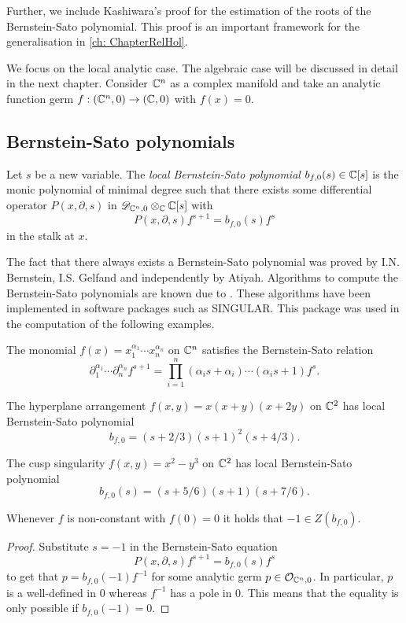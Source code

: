 Further, we include Kashiwara's proof for the estimation of the roots of the Bernstein-Sato polynomial.
This proof is an important framework for the generalisation in \cref{ch: ChapterRelHol}.

We focus on the local analytic case.
The algebraic case will be discussed in detail in the next chapter.
Consider $\mathbb{C}^n$ as a complex manifold and take an analytic function germ $f:(\mathbb{C}^n,0)\to (\mathbb{C},0)$ with  $f(x) = 0$.
\subsection{Bernstein-Sato polynomials}\label{sec: bspoly}
\begin{definition}
  Let $s$ be a new variable.
  The {\it local Bernstein-Sato polynomial} $b_{f,0}(s)\in \mathbb{C}[s]$ is the monic polynomial of minimal degree such that there exists some differential operator $P(x,\partial,s)$ in $\mathscr{D}_{\mathbb{C}^n,0}\otimes_{\mathbb{C}}\mathbb{C}[s]$ with
  $$P(x,\partial,s) f^{s+1} = b_{f,0}(s) f^s$$
  in the stalk at $x$.
\end{definition}
The fact that there always exists a Bernstein-Sato polynomial was proved by I.N. Bernstein, I.S. Gelfand and independently by Atiyah.
Algorithms to compute the Bernstein-Sato polynomials are known due to \cite{oaku1997algorithm}.
These algorithms have been implemented in software packages such as SINGULAR.
This package was used in the computation of the following examples.
\begin{example}\label{ex: Monomial}
  The monomial $f(x) = x_1^{\alpha_1}\cdots x_n^{\alpha_n}$ on $\mathbb{C}^n$ satisfies the Bernstein-Sato relation
  $$\partial_1^{\alpha_1}\cdots \partial_n^{\alpha_n} f^{s+1} = \prod_{i=1}^n (\alpha_i s + \alpha_i)\cdots (\alpha_i s + 1) f^{s}. $$
\end{example}
\begin{example}
  The hyperplane arrangement $f(x,y) = x(x+y)(x+2y)$ on $\mathbb{C}^2$ has local Bernstein-Sato polynomial
  $$ b_{f,0} = (s+2/3)(s+1)^2(s+4/3).$$
\end{example}
\begin{example}\label{example: CuspBs}
  The cusp singularity $f(x,y) = x^2 - y^3$ on $\mathbb{C}^2$ has local Bernstein-Sato polynomial
  $$b_{f,0}(s) = (s+5/6)(s+1)(s+7/6).$$
\end{example}
\begin{proposition}\label{prop: TrivialRoot}
  Whenever $f$ is non-constant with $f(0)=0$ it holds that $-1\in Z(b_{f,0}).$
\end{proposition}
\begin{proof}
  Substitute $s = -1$ in the Bernstein-Sato equation
  $$P(x,\partial,s)f^{s+1} = b_{f,0}(s)f^s $$
  to get that $p = b_{f,0}(-1)f^{-1}$ for some analytic germ $p\in \mathcal{O}_{\mathbb{C}^n,0}$.
  In particular,  $p$ is a well-defined in $0$ whereas $f^{-1}$ has a pole in $0$.
  This means that the equality is only possible if $b_{f,0}(-1)=0$.
\end{proof}
